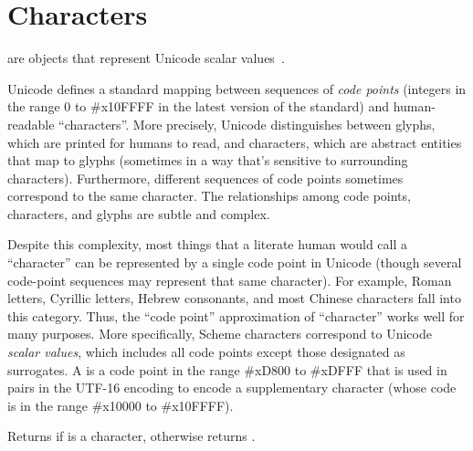 \section{Characters}
\label{charactersection}


 are objects that represent Unicode scalar
values~\cite{Unicode}.

\begin{note}
  Unicode defines a standard mapping between sequences of {\em code
  points} (integers in the range 0 to \#x10FFFF
  in the latest version of the standard) and human-readable
  ``characters''. More precisely, Unicode distinguishes between
  glyphs, which are printed for humans to read, and characters, which
  are abstract entities that map to glyphs (sometimes in a way that's
  sensitive to surrounding characters).  Furthermore, different
  sequences of code points sometimes correspond to the same character.
  The relationships among code points, characters, and glyphs are
  subtle and complex.

  Despite this complexity, most things that a literate human would
  call a ``character'' can be represented by a single code point in
  Unicode (though several code-point sequences may represent
  that same character). For example, Roman letters, Cyrillic letters,
  Hebrew consonants, and most Chinese characters fall into this
  category. Thus, the ``code point'' approximation of ``character''
  works well for many purposes. More specifically, Scheme characters
  correspond to Unicode {\em scalar values}, which includes all code points except those designated as
  surrogates. A  is a code point in the range
  \#xD800 to \#xDFFF that is used in pairs in the UTF-16 encoding to
  encode a supplementary character (whose code is in the range
  \#x10000 to \#x10FFFF).
\end{note}

\begin{entry}{%
}

Returns \schtrue{} if  is a character, otherwise returns \schfalse.

\end{entry}

